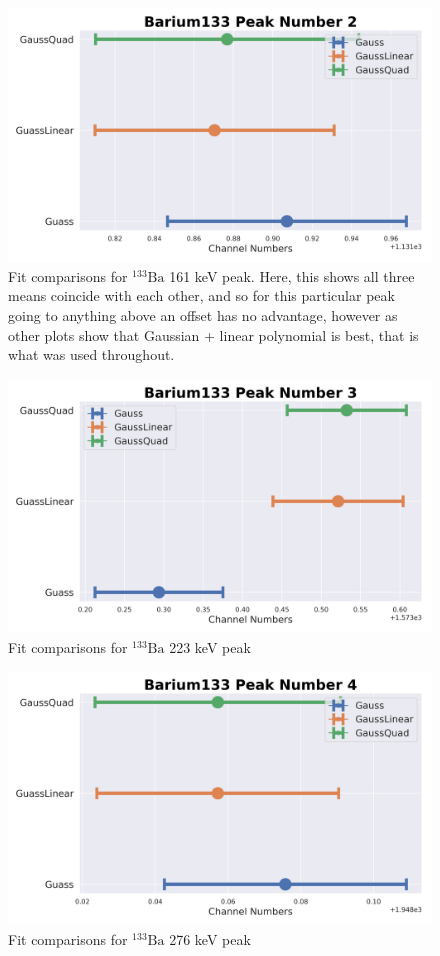 \documentclass[11pt,a4paper]{article}
\newcommand{\element}[2]{$^{#2}\textrm{#1}$}
\begin{document}
\begin{figure}[H]
  \centering
  \includegraphics[width=0.95\linewidth]{./Images/Barium133/FitComparison_Peak2.png}
  \caption{Fit comparisons for \element{Ba}{133} 161 keV peak. Here, this shows all three means coincide with each other, and so for this particular peak going to anything above an offset has no advantage, however as other plots show that Gaussian + linear polynomial is best, that is what was used throughout.}
\end{figure}

\begin{figure}[H]
  \centering
  \includegraphics[width=0.95\linewidth]{./Images/Barium133/FitComparison_Peak3.png}
  \caption{Fit comparisons for \element{Ba}{133} 223 keV peak}
\end{figure}

\begin{figure}[H]
  \centering
  \includegraphics[width=0.95\linewidth]{./Images/Barium133/FitComparison_Peak4.png}
  \caption{Fit comparisons for \element{Ba}{133} 276 keV peak}
\end{figure}
\end{document}
